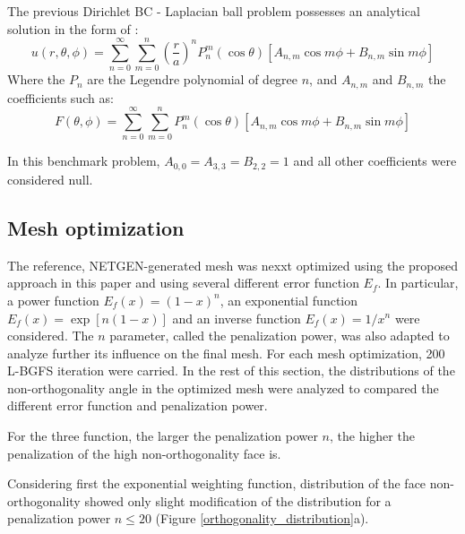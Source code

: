 \documentclass[11pt]{article}
\begin{document}
The previous Dirichlet BC - Laplacian ball problem possesses an analytical solution in the form of \cite{carslaw_jeager_1957}:
%
\begin{equation}
u(r, \theta, \phi) = \sum_{n=0}^\infty \sum_{m=0}^n \left(\frac{r}{a}\right)^n P_n^m(\cos \theta) \left[ A_{n,m} \cos m\phi + B_{n,m} \sin m\phi \right]
\end{equation} 
%
Where the $P_n$ are the Legendre polynomial of degree $n$, and $A_{n,m}$ and $B_{n,m}$ the coefficients such as:
%
\begin{equation}
F(\theta, \phi) = \sum_{n=0}^\infty \sum_{m=0}^n P_n^m(\cos \theta) \left[ A_{n,m} \cos m\phi + B_{n,m} \sin m\phi \right]
\end{equation}
%

In this benchmark problem, $A_{0,0} = A_{3,3} = B_{2,2} =1$ and all other coefficients were considered null.




\subsection{Mesh optimization}

The reference, NETGEN-generated mesh was nexxt optimized using the proposed approach in this paper and using several different error function $E_f$.
In particular, a power function $E_f(x) = (1-x)^n$, an exponential function $E_f(x) = \exp \left[n(1-x) \right]$ and an inverse function $E_f(x) = 1/x^n$ were considered.
The $n$ parameter, called the penalization power, was also adapted to analyze further its influence on the final mesh.
For each mesh optimization, 200 L-BGFS iteration were carried.
In the rest of this section, the distributions of the non-orthogonality angle in the optimized mesh were analyzed to compared the different error function and penalization power.



 
For the three function, the larger the penalization power $n$, the higher the penalization of the high non-orthogonality face is.


Considering first the exponential weighting function, distribution of the face non-orthogonality showed only slight modification of the distribution for a penalization power $n \leq 20$ (Figure \ref{orthogonality_distribution}a).
\end{document}
